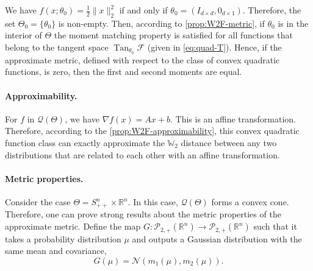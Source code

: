 \documentclass[10pt]{article}
\newcommand{\op}[1]{\operatorname{#1}}
\newcommand{\norm}[1]{\|#1\|}
\newcommand{\Tan}{\op{Tan}}
\newcommand{\real}{\mathbb{R}}
\newcommand{\W}{\mathds{W}}
\newcommand{\calF}{\mathcal{F}}
\newcommand{\Q}{\mathcal{Q}}
\numberwithin{equation}{section}
\begin{document}
We have $f(x;\theta_0) = \frac{1}{2}\norm{x}_2^2$ if and only if $\theta_0=(I_{d\times d},0_{d\times 1})$. Therefore, the set $\Theta_0=\{\theta_0\}$ is non-empty. Then, according to \autoref{prop:W2F-metric}, if $\theta_0$ is in the interior of $\Theta$ the moment matching property is satisfied for all functions that belong to the tangent space $\Tan_{\theta_0}\calF$ (given in \eqref{eq:quad-T}). Hence, if the approximate metric, defined with respect to the class of convex quadratic functions, is zero, then the first and second moments are equal.

 

\paragraph{Approximability.}
For $f$ in $\Q(\Theta)$, we have $\nabla f(x) = Ax + b$. This is an affine transformation. Therefore, according to the \autoref{prop:W2F-approximability}, this convex quadratic function class can exactly approximate the $\W_2$ distance between any two distributions that are related to each other with an affine transformation.

\paragraph{Metric properties.} Consider the case $\Theta =S^n_{++} \times \real^n $. In this case, $\mathcal{Q}(\Theta)$ forms a convex cone. Therefore, one can prove strong results about the metric properties of the approximate metric. 
Define the map $G:\mathcal{P}_{2,+}(\real^n) \to \mathcal{P}_{2,+}(\real^n)$ such that it takes a probability distribution $\mu$ and outputs a Gaussian distribution with the same mean and covariance, 
\begin{equation*}
G(\mu) = \mathcal{N}( m_1(\mu), m_2(\mu) ).
\end{equation*}
\end{document}
